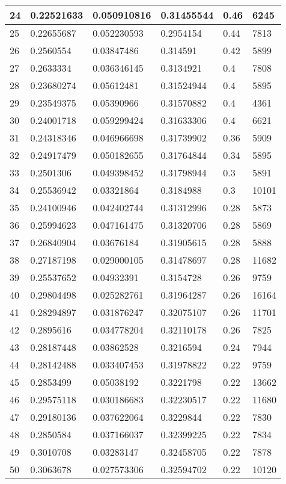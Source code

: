 \begin{longtable}{|l|l|l|l|l|l|}
24 & 0.22521633 & 0.050910816 & 0.31455544 & 0.46 & 6245 \\ \hline 
25 & 0.22655687 & 0.052230593 & 0.2954154 & 0.44 & 7813 \\ \hline 
26 & 0.2560554 & 0.03847486 & 0.314591 & 0.42 & 5899 \\ \hline 
27 & 0.2633334 & 0.036346145 & 0.3134921 & 0.4 & 7808 \\ \hline 
28 & 0.23680274 & 0.05612481 & 0.31524944 & 0.4 & 5895 \\ \hline 
29 & 0.23549375 & 0.05390966 & 0.31570882 & 0.4 & 4361 \\ \hline 
30 & 0.24001718 & 0.059299424 & 0.31633306 & 0.4 & 6621 \\ \hline 
31 & 0.24318346 & 0.046966698 & 0.31739902 & 0.36 & 5909 \\ \hline 
32 & 0.24917479 & 0.050182655 & 0.31764844 & 0.34 & 5895 \\ \hline 
33 & 0.2501306 & 0.049398452 & 0.31798944 & 0.3 & 5891 \\ \hline 
34 & 0.25536942 & 0.03321864 & 0.3184988 & 0.3 & 10101 \\ \hline 
35 & 0.24100946 & 0.042402744 & 0.31312996 & 0.28 & 5873 \\ \hline 
36 & 0.25994623 & 0.047161475 & 0.31320706 & 0.28 & 5869 \\ \hline 
37 & 0.26840904 & 0.03676184 & 0.31905615 & 0.28 & 5888 \\ \hline 
38 & 0.27187198 & 0.029000105 & 0.31478697 & 0.28 & 11682 \\ \hline 
39 & 0.25537652 & 0.04932391 & 0.3154728 & 0.26 & 9759 \\ \hline 
40 & 0.29804498 & 0.025282761 & 0.31964287 & 0.26 & 16164 \\ \hline 
41 & 0.28294897 & 0.031876247 & 0.32075107 & 0.26 & 11701 \\ \hline 
42 & 0.2895616 & 0.034778204 & 0.32110178 & 0.26 & 7825 \\ \hline 
43 & 0.28187448 & 0.03862528 & 0.3216594 & 0.24 & 7944 \\ \hline 
44 & 0.28142488 & 0.033407453 & 0.31978822 & 0.22 & 9759 \\ \hline 
45 & 0.2853499 & 0.05038192 & 0.3221798 & 0.22 & 13662 \\ \hline 
46 & 0.29575118 & 0.030186683 & 0.32230517 & 0.22 & 11680 \\ \hline 
47 & 0.29180136 & 0.037622064 & 0.3229844 & 0.22 & 7830 \\ \hline 
48 & 0.2850584 & 0.037166037 & 0.32399225 & 0.22 & 7834 \\ \hline 
49 & 0.3010708 & 0.03283147 & 0.32458705 & 0.22 & 7878 \\ \hline 
50 & 0.3063678 & 0.027573306 & 0.32594702 & 0.22 & 10120 \\ \hline 
\end{longtable}